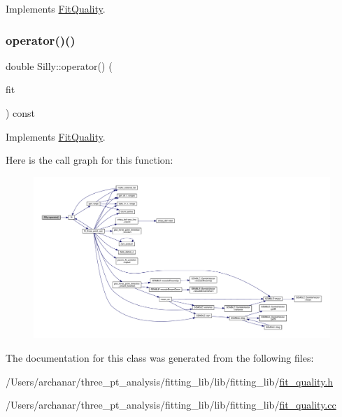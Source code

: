 Implements \mbox{\hyperlink{classFitQuality_a49a49e1206709d71c3ead41e981bb848}{Fit\+Quality}}.

\mbox{\label{classSilly_a7da4b46c49f85b3dbf91bbdcd7299b2c}} 
\subsubsection{\texorpdfstring{operator()()}{operator()()}\hspace{0.1cm}{\footnotesize\ttfamily [2/2]}}
{\footnotesize\ttfamily double Silly\+::operator() (\begin{DoxyParamCaption}\item[{const \mbox{\hyperlink{classAvgFit}{Avg\+Fit}} \&}]{fit }\end{DoxyParamCaption}) const\hspace{0.3cm}{\ttfamily [virtual]}}



Implements \mbox{\hyperlink{classFitQuality_a49a49e1206709d71c3ead41e981bb848}{Fit\+Quality}}.

Here is the call graph for this function\+:
\nopagebreak
\begin{figure}[H]
\begin{center}
\leavevmode
\includegraphics[width=350pt]{dc/d3a/classSilly_a7da4b46c49f85b3dbf91bbdcd7299b2c_cgraph}
\end{center}
\end{figure}


The documentation for this class was generated from the following files\+:\begin{DoxyCompactItemize}
\item 
/\+Users/archanar/three\+\_\+pt\+\_\+analysis/fitting\+\_\+lib/lib/fitting\+\_\+lib/\mbox{\hyperlink{lib_2fitting__lib_2fit__quality_8h}{fit\+\_\+quality.\+h}}\item 
/\+Users/archanar/three\+\_\+pt\+\_\+analysis/fitting\+\_\+lib/lib/fitting\+\_\+lib/\mbox{\hyperlink{fit__quality_8cc}{fit\+\_\+quality.\+cc}}\end{DoxyCompactItemize}
